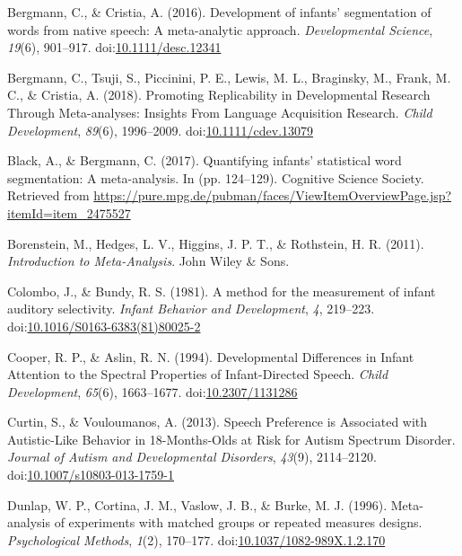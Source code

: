\documentclass[man]{apa6}
\begin{document}
\begingroup
\setlength{\parindent}{-0.5in} \setlength{\leftskip}{0.5in}

\hypertarget{refs}{}
\hypertarget{ref-bergmann_development_2016}{}
Bergmann, C., \& Cristia, A. (2016). Development of infants'
segmentation of words from native speech: A meta-analytic approach.
\emph{Developmental Science}, \emph{19}(6), 901--917.
doi:\href{https://doi.org/10.1111/desc.12341}{10.1111/desc.12341}

\hypertarget{ref-bergmann_promoting_2018}{}
Bergmann, C., Tsuji, S., Piccinini, P. E., Lewis, M. L., Braginsky, M.,
Frank, M. C., \& Cristia, A. (2018). Promoting Replicability in
Developmental Research Through Meta-analyses: Insights From Language
Acquisition Research. \emph{Child Development}, \emph{89}(6),
1996--2009.
doi:\href{https://doi.org/10.1111/cdev.13079}{10.1111/cdev.13079}

\hypertarget{ref-black_quantifying_2017}{}
Black, A., \& Bergmann, C. (2017). Quantifying infants' statistical word
segmentation: A meta-analysis. In (pp. 124--129). Cognitive Science
Society. Retrieved from
\url{https://pure.mpg.de/pubman/faces/ViewItemOverviewPage.jsp?itemId=item_2475527}

\hypertarget{ref-borenstein_introduction_2011}{}
Borenstein, M., Hedges, L. V., Higgins, J. P. T., \& Rothstein, H. R.
(2011). \emph{Introduction to Meta-Analysis}. John Wiley \& Sons.

\hypertarget{ref-colombo_method_1981}{}
Colombo, J., \& Bundy, R. S. (1981). A method for the measurement of
infant auditory selectivity. \emph{Infant Behavior and Development},
\emph{4}, 219--223.
doi:\href{https://doi.org/10.1016/S0163-6383(81)80025-2}{10.1016/S0163-6383(81)80025-2}

\hypertarget{ref-cooper_developmental_1994}{}
Cooper, R. P., \& Aslin, R. N. (1994). Developmental Differences in
Infant Attention to the Spectral Properties of Infant-Directed Speech.
\emph{Child Development}, \emph{65}(6), 1663--1677.
doi:\href{https://doi.org/10.2307/1131286}{10.2307/1131286}

\hypertarget{ref-curtin_speech_2013}{}
Curtin, S., \& Vouloumanos, A. (2013). Speech Preference is Associated
with Autistic-Like Behavior in 18-Months-Olds at Risk for Autism
Spectrum Disorder. \emph{Journal of Autism and Developmental Disorders},
\emph{43}(9), 2114--2120.
doi:\href{https://doi.org/10.1007/s10803-013-1759-1}{10.1007/s10803-013-1759-1}

\hypertarget{ref-dunlap_meta-analysis_1996}{}
Dunlap, W. P., Cortina, J. M., Vaslow, J. B., \& Burke, M. J. (1996).
Meta-analysis of experiments with matched groups or repeated measures
designs. \emph{Psychological Methods}, \emph{1}(2), 170--177.
doi:\href{https://doi.org/10.1037/1082-989X.1.2.170}{10.1037/1082-989X.1.2.170}
\end{document}
